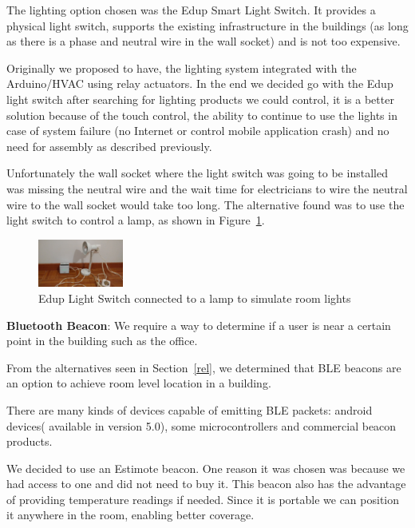 \documentclass[conference]{IEEEtran}
\begin{document}
The lighting option chosen was the Edup Smart Light Switch. It provides a physical light switch, supports the existing infrastructure in the buildings (as long as there is a phase and neutral wire in the wall socket) and is not too expensive.


Originally we proposed to have, the lighting system integrated with the Arduino/\ac{HVAC} using relay actuators. In the end we decided go with the Edup light switch after searching for lighting products we could control, it is a better solution because of the touch control, the ability to continue to use the lights in case of system failure (no Internet or control mobile application crash) and no need for assembly as described previously.

Unfortunately the wall socket where the light switch was going to be installed was missing the neutral wire and the wait time for electricians to wire the neutral wire to the wall socket would take too long. The alternative found was to use the light switch to control a lamp, as shown in Figure~\ref{imp_light_switch_light}.


\begin{figure}[htbp]
\centering
\includegraphics[width=0.25\textwidth]{Figures/imp_light_switch_light}
\caption{Edup Light Switch connected to a lamp to simulate room lights}
\label{imp_light_switch_light}
\end{figure}


\textbf{Bluetooth Beacon}: We require a way to determine if a user is near a certain point in the building such as the office.

From the alternatives seen in Section~\ref{rel}, we  determined that \ac{BLE} beacons are an option to achieve room level location in a building.

There are many kinds of devices capable of emitting \ac{BLE} packets: android devices( available in version 5.0), some microcontrollers and commercial beacon products.

We decided to use an Estimote beacon. One reason it was chosen was because we had access to one and did not need to buy it. This beacon also has the advantage of providing temperature readings if needed. Since it is portable we can position it anywhere in the room, enabling better coverage.
\end{document}
